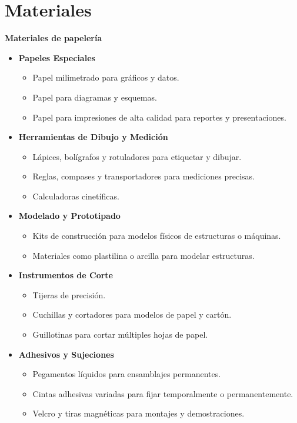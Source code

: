 \newpage
\section{Materiales}
\textbf{Materiales de papelería}

\begin{itemize}
  \item \textbf{Papeles Especiales}
  \begin{itemize}
      \item Papel milimetrado para gráficos y datos.
      \item Papel para diagramas y esquemas.
      \item Papel para impresiones de alta calidad para reportes y presentaciones.
  \end{itemize}
  
  \item \textbf{Herramientas de Dibujo y Medición}
  \begin{itemize}
      \item Lápices, bolígrafos y rotuladores para etiquetar y dibujar.
      \item Reglas, compases y transportadores para mediciones precisas.
      \item Calculadoras cinetíficas.
  \end{itemize}
  
  \item \textbf{Modelado y Prototipado}
  \begin{itemize}
      \item Kits de construcción para modelos físicos de estructuras o máquinas.
      \item Materiales como plastilina o arcilla para modelar estructuras.
  \end{itemize}
  
  \item \textbf{Instrumentos de Corte}
  \begin{itemize}
      \item Tijeras de precisión.
      \item Cuchillas y cortadores para modelos de papel y cartón.
      \item Guillotinas para cortar múltiples hojas de papel.
  \end{itemize}
  
  \item \textbf{Adhesivos y Sujeciones}
  \begin{itemize}
      \item Pegamentos líquidos para ensamblajes permanentes.
      \item Cintas adhesivas variadas para fijar temporalmente o permanentemente.
      \item Velcro y tiras magnéticas para montajes y demostraciones.
  \end{itemize}
  

\end{itemize}
